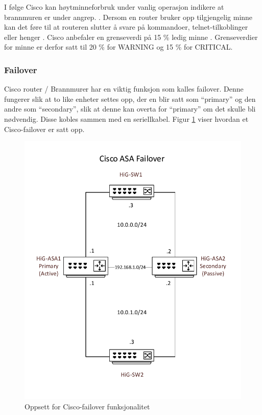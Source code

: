 I følge Cisco kan høytminneforbruk under vanlig operasjon indikere at brannmuren er under angrep. \cite{ciscomem}. Dersom en router bruker opp tilgjengelig minne kan det føre til at routeren slutter å svare på kommandoer, telnet-tilkoblinger eller henger \cite{ciscomemproblem} . Cisco anbefaler en grenseverdi på 15 \% ledig minne \cite{ciscounifiedcommunication}. Grenseverdier for minne er derfor satt til 20 \% for WARNING og 15 \% for CRITICAL.

\subsubsection{Failover}

Cisco router / Brannmurer har en viktig funksjon som kalles failover. Denne fungerer slik at to like enheter settes opp, der en blir satt som “primary” og den andre som “secondary”, slik at denne kan overta for “primary” om det skulle bli nødvendig. Disse kobles sammen med en seriellkabel. Figur \ref{ciscoasafailover} viser hvordan et Cisco-failover er satt opp. 

\begin{figure}
    \centering
    \includegraphics[scale=0.6]{img/asafailover}
    \caption{Oppsett for Cisco-failover funksjonalitet}
    \label{ciscoasafailover}
\end{figure}


